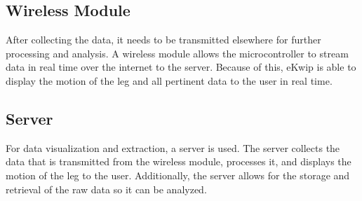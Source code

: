 \subsection {Wireless Module}
After collecting the data, it needs to be transmitted elsewhere for further processing and analysis. A wireless module allows the microcontroller to stream data in real time over the internet to the server. Because of this, eKwip is able to display the motion of the leg and all pertinent data to the user in real time.

\subsection {Server}
For data visualization and extraction, a server is used. The server collects the data that is transmitted from the wireless module, processes it, and displays the motion of the leg to the user. Additionally, the server allows for the storage and retrieval of the raw data so it can be analyzed.
